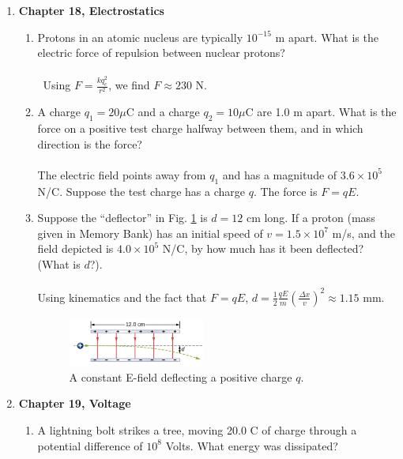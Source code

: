 \documentclass[10pt]{article}
\begin{document}
\clearpage

\begin{enumerate}
\item \textbf{Chapter 18, Electrostatics}
\begin{enumerate}
\item Protons in an atomic nucleus are typically $10^{-15}$ m apart. What is the electric force of repulsion between nuclear protons? \\ \\\
Using $F = \frac{k q_e^2}{r^2}$, we find $F \approx 230$ N. \\
\item A charge $q_1 = 20 \mu$C and a charge $q_2 = 10 \mu$C are 1.0 m apart.  What is the force on a positive test charge halfway between them, and in which direction is the force? \\ \\
The electric field points away from $q_1$ and has a magnitude of $3.6\times 10^5$ N/C.  Suppose the test charge has a charge $q$.  The force is $F = qE$. \\
\item Suppose the ``deflector'' in Fig. \ref{fig:e1} is $d=12$ cm long.  If a proton (mass given in Memory Bank) has an initial speed of $v=1.5 \times 10^{7}$ m/s, and the field depicted is $4.0 \times 10^5$ N/C, by how much has it been deflected?  (What is $d$?). \\ \\
Using kinematics and the fact that $F=qE$, $d = \frac{1}{2} \frac{qE}{m}\left(\frac{\Delta x}{v}\right)^2 \approx 1.15$ mm.
\begin{figure}
\centering
\includegraphics[width=0.45\textwidth]{figures/e1.png}
\caption{\label{fig:e1} A constant E-field deflecting a positive charge $q$.}
\end{figure}
\end{enumerate}
\item \textbf{Chapter 19, Voltage}
\begin{enumerate}
\item A lightning bolt strikes a tree, moving 20.0 C of charge through a potential difference of $10^8$ Volts. What energy was dissipated? \\ \\

\end{enumerate}
\end{enumerate}
\end{document}
